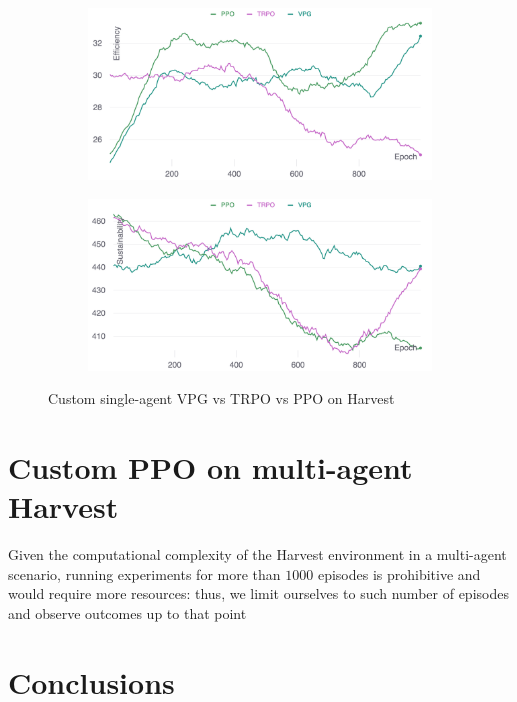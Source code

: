 \documentclass{article}
\begin{document}
\begin{figure}
  \centering
  \begin{subfigure}[b]{0.45\textwidth}
    \centering
    \includegraphics[width=\textwidth]{../assets/vpg-trpo-ppo-single-efficiency}
  \end{subfigure}
  \hfill
  \begin{subfigure}[b]{0.45\textwidth}
    \centering
    \includegraphics[width=\textwidth]{../assets/vpg-trpo-ppo-single-sustainability}
  \end{subfigure}
  \caption{Custom single-agent VPG vs TRPO vs PPO on Harvest}
  \label{fig:vpg-trpo-ppo-single}
\end{figure}

\section{Custom PPO on multi-agent Harvest}
Given the computational complexity of the Harvest environment in a multi-agent scenario, running experiments for more than $1000$ episodes is prohibitive and would require more resources: thus, we limit ourselves to such number of episodes and observe outcomes up to that point


\section{Conclusions}
\end{document}
